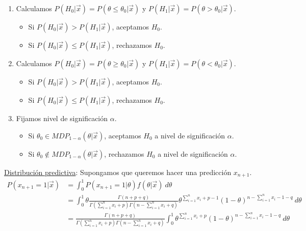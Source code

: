 \begin{enumerate}
    \item Calculamos $P(H_0 | \vec{x}) = P(\theta \leq \theta_0 |\vec{x})$ y $P(H_1 | \vec{x}) = P(\theta > \theta_0 | \vec{x})$.
          \begin{itemize}
              \item Si $P(H_0 | \vec{x}) > P(H_1 | \vec{x})$, aceptamos $H_0$.
              \item Si $P(H_0 | \vec{x}) \leq P(H_1 | \vec{x})$, rechazamos $H_0$.
          \end{itemize}
    \item Calculamos $P(H_0 | \vec{x}) = P(\theta \ge \theta_0 |\vec{x})$ y $P(H_1 | \vec{x}) = P(\theta < \theta_0 | \vec{x})$.
          \begin{itemize}
              \item Si $P(H_0 | \vec{x}) > P(H_1 | \vec{x})$, aceptamos $H_0$.
              \item Si $P(H_0 | \vec{x}) \leq P(H_1 | \vec{x})$, rechazamos $H_0$.
          \end{itemize}
    \item Fijamos nivel de significación $\alpha$.
          \begin{itemize}
              \item Si $\theta_0 \in MDP_{1 - \alpha}(\theta | \vec{x})$, aceptamos $H_0$ a nivel de significación $\alpha$.
              \item Si $\theta_0 \not\in MDP_{1 - \alpha}(\theta | \vec{x})$, rechazamos $H_0$ a nivel de significación $\alpha$.
          \end{itemize}
\end{enumerate}
\underline{Distribución predictiva}: Supongamos que queremos hacer una predicción $x_{n+1}$.
\begin{align*}
    P(x_{n+1} = 1 | \vec{x}) & = \int_{0}^{1} P(x_{n+1} = 1 | \theta) f(\theta | \vec{x}) \ d\theta                                                                                                                                  \\
                             & = \int_{0}^{1} \theta \frac{\Gamma(n+p+q)}{\Gamma(\sum_{i=1}^{n} x_i + p)\Gamma(n-\sum_{i=1}^{n} x_i +q)} \theta^{\sum_{i=1}^{n} x_i + p - 1} (1 - \theta)^{n - \sum_{i=1}^{n} x_i - 1 - q} \ d\theta \\
                             & = \frac{\Gamma(n+p+q)}{\Gamma(\sum_{i=1}^{n} x_i + p)\Gamma(n-\sum_{i=1}^{n} x_i +q)} \int_{0}^{1} \theta^{\sum_{i=1}^{n} x_i + p} (1 - \theta)^{n - \sum_{i=1}^{n} x_i - 1 - q} \ d\theta
\end{align*}
